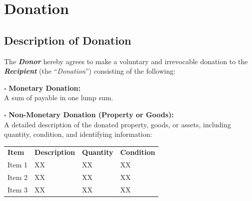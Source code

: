 
\section{Donation}
\label{sec:donation}

\subsection{Description of Donation}

The \textbf{\textit{Donor}} hereby agrees to make a voluntary and irrevocable donation to the \textbf{\textit{Recipient}} (the “\textit{Donation}”) consisting of the following:

\vspace{0.3cm}

\noindent $\square$ \textbf{Monetary Donation:} \\
A sum of \donationAmount{} payable in one lump sum.

\vspace{0.3cm}

\noindent $\square$ \textbf{Non-Monetary Donation (Property or Goods):} \\
A detailed description of the donated property, goods, or assets, including quantity, condition, and identifying information:

\vspace{0.3cm}

\noindent
\begin{tabular}{p{4cm} p{4cm} p{4cm} p{4cm}}
\textbf{Item} & \textbf{Description} & \textbf{Quantity} & \textbf{Condition} \\ 
Item 1 & XX & XX & XX \\ 
Item 2 & XX & XX & XX \\ 
Item 3 & XX & XX & XX \\ 
\end{tabular}

